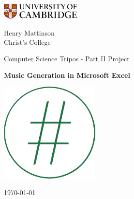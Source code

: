 %
%

\begin{titlepage}
	\noindent
	\begin{minipage}[t][][t]{0.329\textwidth}
    \begin{flushleft}
		\includegraphics[width=40mm]{figs/cam.jpg}
  \end{flushleft}
	\end{minipage}
  \begin{minipage}[t][][t]{0.329\textwidth}
    \begin{center}
  	\end{center}
	\end{minipage}
	\begin{minipage}{0.329\textwidth}
	\begin{flushright}
    \vspace{-8pt}
		\large Henry Mattinson \\
		Christ's College
	\end{flushright}
	\end{minipage}

	\begin{center}
	\vspace{6cm}
	{\sc\large Computer Science Tripos - Part II Project\par}
	\vspace{0.5cm}
	{\huge\bf Music Generation in Microsoft Excel\par}
  \vspace{0.8cm}
  {\includegraphics[width=50mm]{figs/excelloLogoRing.png} \par}
  \vspace{0.5cm}
	{\large \today \par}
	\end{center}

\end{titlepage}
